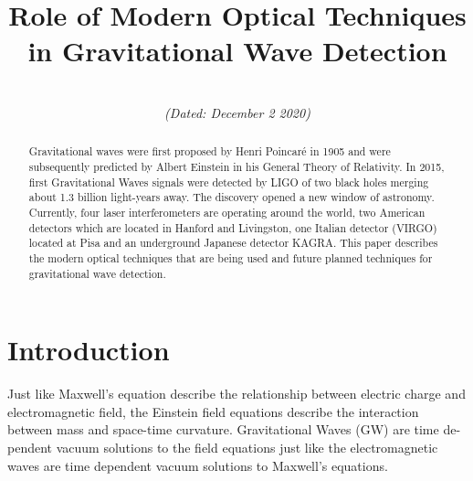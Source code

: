\documentclass[conference]{IEEEtran}
\begin{document}
\title{Role of Modern Optical Techniques in Gravitational Wave Detection\\
}

\author{
\\
\textit{(Dated: December 2 2020)}
}

\maketitle
\thispagestyle{plain}
\begin{abstract}

Gravitational waves were first proposed by Henri Poincaré in 1905 and were subsequently predicted by Albert Einstein in his General Theory of Relativity. In 2015, first Gravitational Waves signals were detected by LIGO of two black holes merging about 1.3 billion light-years away. The discovery opened a new window of astronomy. Currently, four laser interferometers are operating around the world, two American detectors which are located in Hanford and Livingston, one Italian detector (VIRGO) located at Pisa and an underground Japanese detector KAGRA. This paper describes the modern optical techniques that are being used and future planned techniques for gravitational wave detection.    
\end{abstract}


\section{Introduction}
Just like Maxwell’s equation describe the relationship between electric charge and electromagnetic field, the Einstein field equations describe the interaction between mass and space-time curvature. Gravitational Waves (GW) are time de-pendent vacuum solutions to the field equations just like the electromagnetic waves are time dependent vacuum solutions to Maxwell’s equations. 
\end{document}
